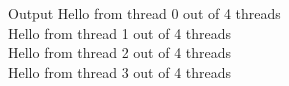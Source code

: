 \documentclass[c,mathserif,compress,xcolor=svgnames]{beamer}
\newenvironment{eblock}[0]
{
\begin{beamerboxesrounded}[upper=uppercol2,lower=lowercol2,shadow=true]}
{\end{beamerboxesrounded}}
\begin{document}
\begin{frame}
\begin{columns}
  \end{columns}
  \begin{columns}
    \column{5cm}
    \begin{eblock}{Output}
      Hello from thread 0 out of 4 threads\\
      Hello from thread 1 out of 4 threads\\
      Hello from thread 2 out of 4 threads\\
      Hello from thread 3 out of 4 threads
    \end{eblock}
  \end{columns}
\end{frame}
\end{document}
